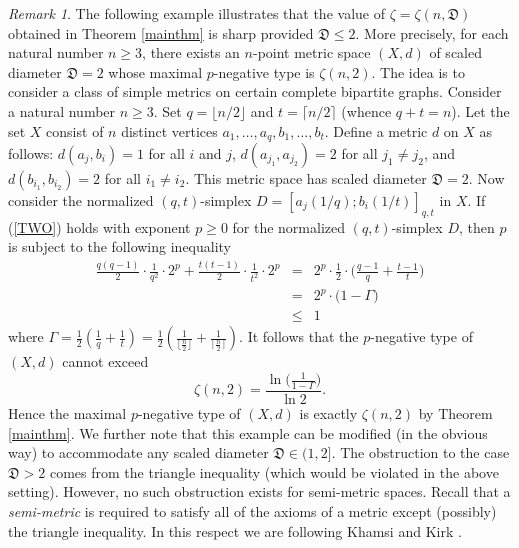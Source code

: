 \documentclass[10pt]{amsart}
\theoremstyle{definition}
\theoremstyle{remark}
\newtheorem{rem}[thm]{Remark}
\begin{document}
\begin{rem}\label{mainexample}
The following example illustrates that the value of $\zeta = \zeta(n, \mathfrak{D})$ obtained in Theorem
\ref{mainthm} is sharp provided $\mathfrak{D} \leq 2$. More precisely, for each natural number $n \geq 3$,
there exists an $n$-point metric space $(X,d)$ of scaled diameter $\mathfrak{D} = 2$
whose maximal $p$-negative type is $\zeta(n,2)$.
The idea is to consider a class of simple metrics on certain complete bipartite graphs.
Consider a natural number $n \geq 3$. Set $q = \lfloor n/2 \rfloor$ and $t = \lceil n/2 \rceil$
(whence $q+t = n$).
Let the set $X$ consist of $n$ distinct vertices $a_{1}, \ldots, a_{q}, b_{1}, \ldots, b_{t}$.
Define a metric $d$ on $X$ as follows: $d(a_{j},b_{i})=1$ for all $i$ and $j$,
$d(a_{j_{1}},a_{j_{2}}) = 2$ for all $j_{1} \not= j_{2}$, and $d(b_{i_{1}},b_{i_{2}}) = 2$
for all $i_{1} \not= i_{2}$. This metric space has scaled diameter $\mathfrak{D} = 2$.
Now consider the normalized $(q,t)$-simplex $D=[a_{j}(1/q);b_{i}(1/t)]_{q,t}$ in $X$.
If (\ref{TWO}) holds with exponent $p \geq 0$ for the normalized $(q,t)$-simplex $D$,
then $p$ is subject to the following inequality
\begin{eqnarray*}
\frac{q(q-1)}{2} \cdot \frac{1}{q^{2}} \cdot 2^{p} +
\frac{t(t-1)}{2} \cdot \frac{1}{t^{2}} \cdot 2^{p} 
& = & 2^{p} \cdot \frac{1}{2} \cdot \Biggl( \frac{q-1}{q} + \frac{t-1}{t} \Biggl) \\
& = & 2^{p} \cdot \bigl( 1 - \Gamma \bigl) \\
& \leq & 1
\end{eqnarray*}
where $\Gamma = \frac{1}{2} \left( \frac{1}{q}
+ \frac{1}{t} \right)
= \frac{1}{2} \left( \frac{1}{\lfloor \frac{n}{2} \rfloor}
+ \frac{1}{\lceil \frac{n}{2} \rceil} \right)$.
It follows that the $p$-negative type of $(X,d)$ cannot exceed
\[
\zeta(n,2)  =  \frac{\ln \bigl( \frac{1}{1 - \Gamma} \bigl)}{\ln 2}.
\]
Hence the maximal $p$-negative type of $(X,d)$ is exactly $\zeta(n, 2)$ by Theorem \ref{mainthm}.
We further note that this example can be modified (in the obvious way) to accommodate any scaled diameter
$\mathfrak{D} \in (1,2]$. The obstruction to the case $\mathfrak{D} > 2$ comes from the triangle inequality
(which would be violated in the above setting). However, no such obstruction exists for semi-metric spaces.
Recall that a \textit{semi-metric} is required to satisfy all of the axioms of a metric except (possibly)
the triangle inequality. In this respect we are following Khamsi and Kirk \cite{KK}.
\end{rem}
\end{document}
